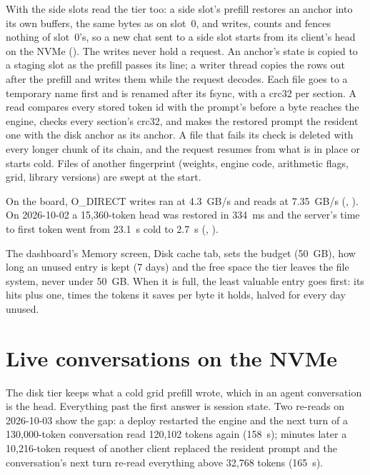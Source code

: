 With  the side slots read the tier too: a side slot's prefill restores an anchor into its own buffers, the same bytes as on slot~0, and writes, counts and fences nothing of slot~0's, so a new chat sent to a side slot starts from its client's head on the NVMe (). The writes never hold a request. An anchor's state is copied to a staging slot as the prefill passes its line; a writer thread copies the rows out after the prefill and writes them while the request decodes. Each file goes to a temporary name first and is renamed after its fsync, with a crc32 per section. A read compares every stored token id with the prompt's before a byte reaches the engine, checks every section's crc32, and makes the restored prompt the resident one with the disk anchor as its anchor. A file that fails its check is deleted with every longer chunk of its chain, and the request resumes from what is in place or starts cold. Files of another fingerprint (weights, engine code, arithmetic flags, grid, library versions) are swept at the start.

On the board, O\_DIRECT writes ran at 4.3~GB/s and reads at 7.35~GB/s (\measured, ). On 2026-10-02 a 15,360-token head was restored in 334~ms and the server's time to first token went from 23.1~s cold to 2.7~s (\measured, ).

The dashboard's Memory screen, Disk cache tab, sets the budget (50~GB), how long an unused entry is kept (7 days) and the free space the tier leaves the file system, never under 50~GB. When it is full, the least valuable entry goes first: its hits plus one, times the tokens it saves per byte it holds, halved for every day unused.

\section{Live conversations on the NVMe}\label{sec:spill}

The disk tier keeps what a cold grid prefill wrote, which in an agent conversation is the head. Everything past the first answer is session state. Two re-reads on 2026-10-03 show the gap: a deploy restarted the engine and the next turn of a 130,000-token conversation read 120,102 tokens again (158~s); minutes later a 10,216-token request of another client replaced the resident prompt and the conversation's next turn re-read everything above 32,768 tokens (165~s).

